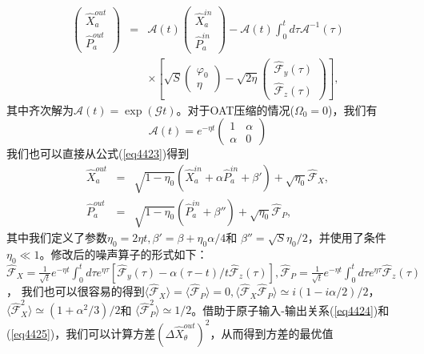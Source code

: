 \begin{eqnarray}
\left( {\begin{array}{*{20}{l}}
	{\hat X_a^{out}}\\
	{\hat P_a^{out}}
	\end{array}} \right) &=& \mathcal{A}\left( t \right)\left( {\begin{array}{*{20}{l}}
	{\hat X_a^{in}}\\
	{\hat P_a^{in}}
	\end{array}} \right) - \mathcal{A}\left( t \right)\int_0^t {d\tau {\mathcal{A}^{ - 1}}\left( \tau  \right)} \nonumber\\
&&\times \left[ {\sqrt S \left( {\begin{array}{*{20}{l}}
		{{\varphi _0}}\\
		\eta
		\end{array}} \right) - \sqrt {2\eta } \left( {\begin{array}{*{20}{l}}
		{{{\hat {\mathcal{F}}}_y\left( \tau \right)}}\\
		{{{\hat {\mathcal{F}}}_z\left( \tau \right)}}
		\end{array}} \right)} \right],\label{eq4423}
\end{eqnarray}
其中齐次解为$\mathcal{A}\left( t \right)=\exp(\mathcal{G}t)$。对于OAT压缩的情况($\Omega_0=0$)，我们有%
$$\mathcal{A}(t)={e^{ - \eta t}}\left(\begin{array}{cc}
1 & \alpha \\
\alpha & 0
\end{array}\right)$$
我们也可以直接从公式(\ref{eq4423})得到
\begin{eqnarray}
\hat X_a^{out} &=& \sqrt {1 - {\eta _0}} \left( {\hat X_a^{in} + \alpha \hat P_a^{in} + \beta' } \right) + \sqrt {{\eta _0}} {{\hat{\mathcal{F}}}_X},\label{eq4424}\\
\hat P_a^{out} &=& \sqrt {1 - {\eta _0}} \left( {\hat P_a^{in} + \beta ''} \right) + \sqrt {{\eta _0}} {{\hat{{\mathcal{F}}}}_P},\label{eq4425}
\end{eqnarray}
其中我们定义了参数$\eta_0=2\eta t, \beta'=\beta+\eta_0\alpha/4$和 $\beta''=\sqrt{S}\eta_0/2$，并使用了条件 $\eta_0\ll 1$。修改后的噪声算子的形式如下：$\hat{\mathcal{F}}_X=\frac{1}{\sqrt t}e^{-\eta t}\int_0^td\tau e^{\eta \tau}[\hat{\mathcal{F}}_y(\tau)-\alpha(\tau-t)/t\hat{\mathcal{F}}_z(\tau)],\hat{\mathcal{F}}_P=\frac{1}{\sqrt t}e^{-\eta t}\int_0^td\tau e^{\eta \tau}\hat{\mathcal{F}}_z(\tau)$， 我们也可以很容易的得到$\langle\hat{\mathcal{F}}_X\rangle=\langle \hat{\mathcal{F}}_P\rangle=0,\langle\hat{\mathcal{F}}_X \hat{\mathcal{F}}_P\rangle\simeq i(1-i\alpha/2)/2$，$\langle\hat{\mathcal{F}}_X^2\rangle\simeq (1+\alpha^2/3)/2$和 $\langle \hat{\mathcal{F}}_P^2\rangle\simeq 1/2$。借助于原子输入-输出关系(\ref{eq4424})和(\ref{eq4425})，我们可以计算方差$(\Delta\hat X_\theta^{out})^2$，从而得到方差的最优值
